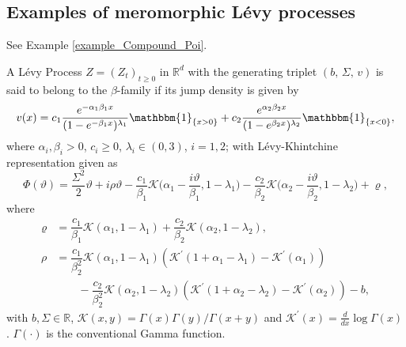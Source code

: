 \subsection{Examples of meromorphic  L\'evy processes}\label{ibr}
\begin{example} See Example \ref{example_Compound_Poi}.
\end{example}

\begin{example}\label{Example_betafam}
A L\'evy Process $Z =(Z_t)_{t \geq 0}$ in $\mathbb{R}^d$ with the generating triplet $(b, \, \Sigma,\, v)$ is said to belong to the $\beta$-family if its jump density is given by
\begin{equation}\label{meromorphic}
    v(x) = c_1 \dfrac{e^{-\alpha_1 \beta_1 x}}{(1 -e^{-\beta_1 x})^{\lambda_1}}\mathbbm{1}_{\{x > 0\}} + c_2 \dfrac{e^{\alpha_2 \beta_2 x}}{(1 -e^{\beta_2 x})^{\lambda_2}}\mathbbm{1}_{\{x < 0\}},
\end{equation}
where $\alpha_i, \beta_i > 0 $, $c_i \geq 0$, $\lambda_{i} \in (0, 3)$, $i = 1, 2$; with L\'evy-Khintchine representation given as 
\begin{equation*}
    \Phi(\vartheta) = \dfrac{\Sigma^2}{2}\vartheta + i \rho \vartheta - \dfrac{c_1}{\beta_1}\mathcal{K} \bigg(\alpha_1 - \dfrac{i\vartheta}{\beta_1}, 1 - \lambda_1 \bigg) - \dfrac{c_2}{\beta_2}\mathcal{K} \bigg(\alpha_2 - \dfrac{i\vartheta}{\beta_2}, 1 - \lambda_2 \bigg) + \varrho,
\end{equation*}
where 
\begin{equation*}
    \begin{aligned}
         \varrho &= \dfrac{c_1}{\beta_1}\mathcal{K} (\alpha_1, 1 - \lambda_1) + \dfrac{c_2}{\beta_2}\mathcal{K}(\alpha_2, 1 - \lambda_2),\\
         \rho &= \dfrac{c_1}{\beta_2^2}\mathcal{K}(\alpha_1, 1 - \lambda_1) (\mathcal{K}^\prime(1 + \alpha_1 - \lambda_1) - \mathcal{K}^\prime(\alpha_1 ))\\
         &\qquad - \dfrac{c_2}{\beta_2^2}\mathcal{K}(\alpha_2, 1 - \lambda_2) (\mathcal{K}^\prime(1 + \alpha_2 - \lambda_2) - \mathcal{K}^\prime(\alpha_2)) - b,
    \end{aligned}
\end{equation*}
with $b, \Sigma \in \mathbb{R}$, $\mathcal{K}(x, y) = \Gamma(x) \Gamma(y) / \Gamma(x + y)$ and $\mathcal{K}^\prime(x) = \frac{d}{dx}\log\Gamma(x)$. $\Gamma(\cdot)$ is the conventional Gamma function.\\

\end{example}
